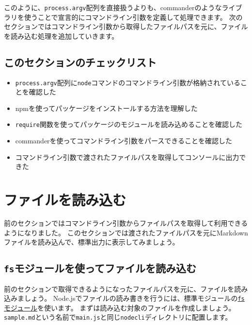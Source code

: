 このように、\texttt{process.argv}配列を直接扱うよりも、commanderのようなライブラリを使うことで宣言的にコマンドライン引数を定義して処理できます。
次のセクションではコマンドライン引数から取得したファイルパスを元に、ファイルを読み込む処理を追加していきます。

\hypertarget{section-checklist}{%
\subsection{このセクションのチェックリスト}\label{section-checklist}}

\begin{itemize}
\item
  \texttt{process.argv}配列に\texttt{node}コマンドのコマンドライン引数が格納されていることを確認した
\item
  npmを使ってパッケージをインストールする方法を理解した
\item
  \texttt{require}関数を使ってパッケージのモジュールを読み込めることを確認した
\item
  commanderを使ってコマンドライン引数をパースできることを確認した
\item
  コマンドライン引数で渡されたファイルパスを取得してコンソールに出力できた
\end{itemize}

\hypertarget{read-file}{%
\section{ファイルを読み込む}\label{read-file}}

前のセクションではコマンドライン引数からファイルパスを取得して利用できるようになりました。
このセクションでは渡されたファイルパスを元にMarkdownファイルを読み込んで、標準出力に表示してみましょう。

\hypertarget{read-file-by-fs}{%
\subsection{\texorpdfstring{\texttt{fs}モジュールを使ってファイルを読み込む}{fsモジュールを使ってファイルを読み込む}}\label{read-file-by-fs}}

前のセクションで取得できるようになったファイルパスを元に、ファイルを読み込みましょう。
Node.jsでファイルの読み書きを行うには、標準モジュールの\href{https://nodejs.org/api/fs.html}{\texttt{fs}モジュール}を使います。
まずは読み込む対象のファイルを作成しましょう。\texttt{sample.md}という名前で\texttt{main.js}と同じ\texttt{nodecli}ディレクトリに配置します。

